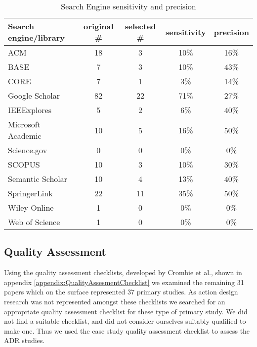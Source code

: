 \begin{table}[h]
    \begin{center}
        \begin{tabular}{ | l | c | c | c | c |} 
            \hline
            Search engine/library     & original \# & selected \# & sensitivity & precision\\
            \hline
            \hline
            ACM                        & 18          & 3           & 10\%        &  16\%    \\
            BASE                       & 7           & 3           & 10\%        &  43\%    \\
            CORE                       & 7           & 1           &  3\%        &  14\%    \\
            Google Scholar             & 82          & 22          & 71\%        &  27\%    \\
            IEEExplores                & 5           & 2           &  6\%        &  40\%    \\
            Microsoft Academic         & 10          & 5           & 16\%        &  50\%    \\
            Science.gov                & 0           & 0           &  0\%        &   0\%    \\
            SCOPUS                     & 10          & 3           & 10\%        &  30\%    \\
            Semantic Scholar           & 10          & 4           & 13\%        &  40\%    \\
            SpringerLink               & 22          & 11          & 35\%        &  50\%    \\
            Wiley Online               & 1           & 0           &  0\%        &   0\%    \\
            Web of Science             & 1           & 0           &  0\%        &   0\%    \\
            \hline
        \end{tabular}
    \end{center}
    \caption{Search Engine sensitivity and precision}
    \label{table:sensitivity_precision}
\end{table}


\subsection{Quality Assessment}
Using the quality assessment checklists, developed by Crombie et al.\cite{crombie1997pocket}, shown in appendix \ref{appendix:QualityAssesmentChecklist} we examined the remaining 31 papers which on the surface represented 37 primary studies.
As action design research was not represented amongst these checklists we searched for an appropriate quality assessment checklist for these type of primary study.
We did not find a suitable checklist, and did not consider ourselves suitably qualified to make one.
Thus we used the case study quality assessment checklist to assess the ADR studies.

